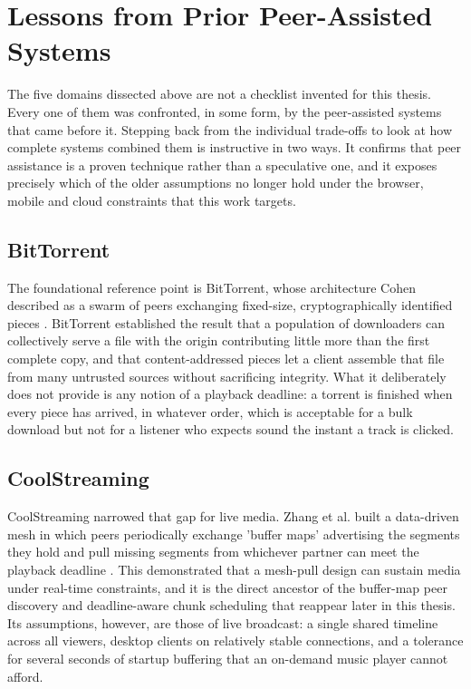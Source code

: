 \section{Lessons from Prior Peer-Assisted Systems}
\indent \par The five domains dissected above are not a checklist invented for this thesis. Every one of them was confronted, in some form, by the peer-assisted systems that came before it. Stepping back from the individual trade-offs to look at how complete systems combined them is instructive in two ways. It confirms that peer assistance is a proven technique rather than a speculative one, and it exposes precisely which of the older assumptions no longer hold under the browser, mobile and cloud constraints that this work targets.

\subsection{BitTorrent}
\indent \par The foundational reference point is BitTorrent, whose architecture Cohen described as a swarm of peers exchanging fixed-size, cryptographically identified pieces \cite{bittorent}. BitTorrent established the result that a population of downloaders can collectively serve a file with the origin contributing little more than the first complete copy, and that content-addressed pieces let a client assemble that file from many untrusted sources without sacrificing integrity. What it deliberately does not provide is any notion of a playback deadline: a torrent is finished when every piece has arrived, in whatever order, which is acceptable for a bulk download but not for a listener who expects sound the instant a track is clicked.

\subsection{CoolStreaming}
\indent \par CoolStreaming narrowed that gap for live media. Zhang et al. built a data-driven mesh in which peers periodically exchange 'buffer maps' advertising the segments they hold and pull missing segments from whichever partner can meet the playback deadline \cite{coolstreaming}. This demonstrated that a mesh-pull design can sustain media under real-time constraints, and it is the direct ancestor of the buffer-map peer discovery and deadline-aware chunk scheduling that reappear later in this thesis. Its assumptions, however, are those of live broadcast: a single shared timeline across all viewers, desktop clients on relatively stable connections, and a tolerance for several seconds of startup buffering that an on-demand music player cannot afford.

